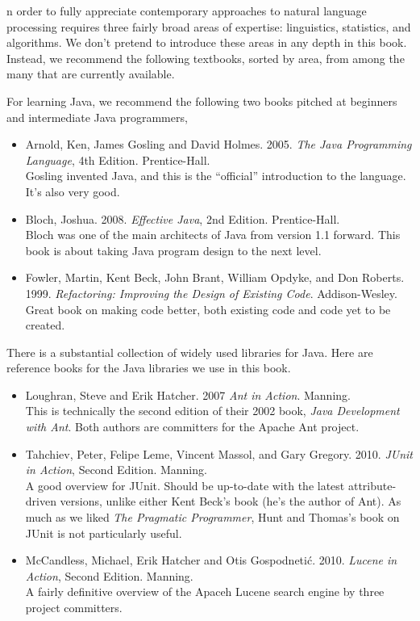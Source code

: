 \label{appendix:reading}

\noindent
{}n order to fully appreciate contemporary approaches to natural language
processing requires three fairly broad areas of expertise:
linguistics, statistics, and algorithms.  We don't pretend to
introduce these areas in any depth in this book.  Instead, we
recommend the following textbooks, sorted by area, from among the many
that are currently available.


\noindent
For learning Java, we recommend the following two books pitched at
beginners and intermediate Java programmers,
%
\begin{itemize}
\item Arnold, Ken, James Gosling and David Holmes.  2005.
{\it The Java Programming Language}, 4th Edition.  Prentice-Hall.
\\
{\footnotesize Gosling invented Java, and this is the ``official'' introduction to the
language.  It's also very good.}
%
\item Bloch, Joshua. 2008. {\it Effective Java}, 2nd Edition.  Prentice-Hall.
\\
{\footnotesize Bloch was one of the main architects of Java from
version 1.1 forward.  This book is about taking Java program design
to the next level.}
%
\item
Fowler, Martin, Kent Beck, John Brant, William Opdyke, and Don Roberts.
1999.
{\it Refactoring: Improving the Design of Existing Code}.
Addison-Wesley.
\\
{\footnotesize Great book on making code better, both existing
code and code yet to be created.}
\end{itemize}
%


\noindent
There is a substantial collection of widely used libraries for Java.
Here are reference books for the Java libraries we use in this book.
%
\begin{itemize}
%
\item 
Loughran, Steve and Erik Hatcher. 2007
{\it Ant in Action}.  Manning.
\\
{\footnotesize This is technically the second edition of their 2002
book, {\it Java Development with Ant}.  Both authors are committers for
the Apache Ant project.}
%
\item
Tahchiev, Peter, Felipe Leme,
Vincent Massol, and Gary Gregory. 2010.
{\it JUnit in Action}, Second Edition.  Manning.
\\
{\footnotesize A good overview for JUnit.  Should be up-to-date with
the latest attribute-driven versions, unlike either Kent Beck's book
(he's the author of Ant).  As much as we liked {\it The Pragmatic
Programmer}, Hunt and Thomas's book on JUnit is not particularly useful.}
%
\item
McCandless, Michael, Erik Hatcher and Otis Gospodneti\'c.
2010.
{\it Lucene in Action}, Second Edition. Manning.
\\
{\footnotesize A fairly definitive overview of the Apaceh Lucene
search engine by three project committers.}
\end{itemize}


